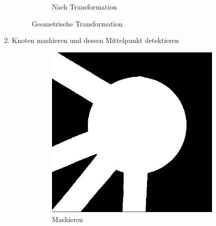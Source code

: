 \begin{enumerate}
\begin{figure}[H]
\begin{subfigure}{0.4\textwidth}
        \caption{Nach Transformation}
        \label{fig:node-after-geometric-transform}
        \end{subfigure}
        \caption{Geometrische Transformation}
        \label{fig:node-geometric-transform}
        \end{figure}
    \item Knoten maskieren und dessen Mittelpunkt detektieren
        \begin{figure}[H]
        \centering
        \begin{subfigure}{0.4\textwidth}
        \centering
        \includegraphics[width=0.95\linewidth]{assets/informatik-prototyp/opencv/angle_detection/node_after_transformation_masked.png} 
        \caption{Maskieren}
        \label{fig:node-masked}
        \end{subfigure}
        \begin{subfigure}{0.4\textwidth}
        \centering

\end{subfigure}
\end{figure}
\end{enumerate}
